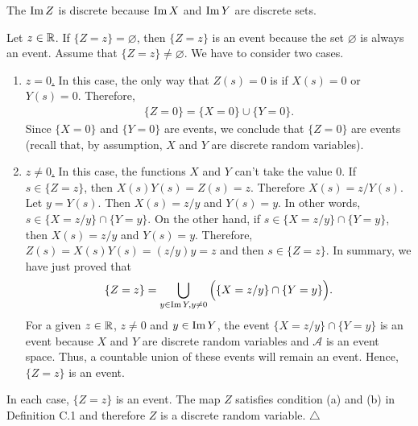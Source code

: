     \begin{problem}
    The $\operatorname{Im} Z$ is discrete because $\operatorname{Im} X$ and $\operatorname{Im} Y$ are discrete sets. 

    Let $z \in \mathbb{R}$. If $\{ Z = z \} = \varnothing$, then $\{ Z = z \}$ is an event because the set $\varnothing$ is always an event. Assume that $\{ Z = z \} \neq \varnothing$. We have to consider two cases.
        \begin{enumerate}[label=\roman*)]
            \item \underline{$z = 0$.} In this case, the only way that $Z (s) = 0$ is if $X (s) = 0$ or $Y (s) = 0$. Therefore,
                \begin{align*}
                \{ Z = 0 \} = \{ X = 0 \} \cup \{ Y = 0 \} .
                \end{align*} 
            Since $\{ X = 0 \}$ and $\{ Y = 0  \}$ are events, we conclude that $\{ Z = 0 \}$ are events (recall that, by assumption, $X$ and $Y$ are discrete random variables). 
            \item \underline{$z \neq 0$.} In this case, the functions $X$ and $Y$ can't take the value $0$. If $s \in \{ Z = z \}$, then $X(s) Y(s)= Z(s) = z$. Therefore $X(s) = z/ Y(s)$. Let $y = Y (s)$. Then $X(s) = z/y$ and $Y(s) = y$. In other words, $s \in \{ X = z/y\} \cap \{ Y = y \}$. On the other hand, if $s \in \{ X = z/y \} \cap \{ Y = y \}$, then $X(s) = z/y$ and $Y(s) = y$. Therefore, $Z(s) = X(s) Y(s) = (z/y) y = z$ and then $s \in \{ Z = z \}$. In summary, we have just proved that
            \begin{align*}
            \{ Z = z \} = \bigcup_{y \in \operatorname{Im} Y, y \neq 0} \Big( \{ X = z /y \} \cap \{ Y = y \} \Big) .
            \end{align*} 
            For a given $z \in \mathbb{R}$, $z \neq 0$ and $y \in \operatorname{Im} Y$, the event $\{ X = z / y \} \cap \{ Y = y \}$ is an event because $X$ and $Y$ are discrete random variables and $\mathcal{A}$ is an event space. Thus, a countable union of these events will remain an event. Hence, $\{ Z = z \}$ is an event. 
        \end{enumerate}
        In each case, $\{ Z = z \}$ is an event. The map $Z$ satisfies condition (a) and (b) in Definition C.1 and therefore $Z$ is a discrete random variable. \hfill $\triangle$
    \end{problem}

